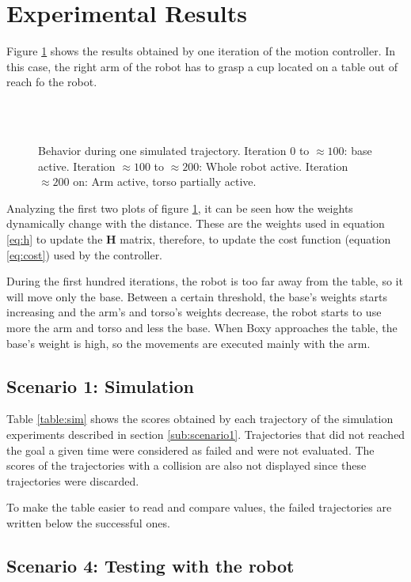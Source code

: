 \section{Experimental Results}

Figure \ref{fig:exp} shows the results obtained by one iteration of the motion controller. In this case, the right arm of the robot has to grasp a cup located on a table out of reach fo the robot.

\begin{figure}[H]
	\centering
	 \\ \vspace{-15pt}
	 \\ \vspace{-5pt}
	 \vspace{-5pt}
	 \vspace{-5pt}
	 \vspace{-20pt}
	\caption[Trajectory Result]{Behavior during one simulated trajectory. Iteration $0$ to $\approx100$: base active. Iteration $\approx100$ to $\approx200$: Whole robot active. Iteration $\approx200$ on: Arm active, torso partially active.} \vspace{-15pt} \label{fig:exp}
\end{figure}

Analyzing  the first two plots of figure \ref{fig:exp}, it can be seen how the weights dynamically change with the distance. These are the weights used in equation \ref{eq:h} to update the $\textbf{H}$ matrix, therefore, to update the cost function (equation \ref{eq:cost}) used by the controller. 

During the first hundred iterations, the robot is too far away from the table, so it will move only the base. Between a certain threshold, the base's weights starts increasing and the arm's and torso's weights decrease, the robot starts to use more the arm and torso and less the base. When Boxy approaches the table, the base's weight is high, so the movements are executed mainly with the arm.

\subsection{Scenario 1: Simulation}
\label{res:sim}

Table \ref{table:sim} shows the scores obtained by each trajectory of the simulation experiments described in section \ref{sub:scenario1}.   Trajectories that did not reached the goal a given time were considered as failed and were not evaluated. The scores of the trajectories with a collision are also not displayed since these trajectories were discarded.

To make the table easier to read and compare values, the failed trajectories are written below the successful ones.






\subsection{Scenario 4: Testing with the robot}

